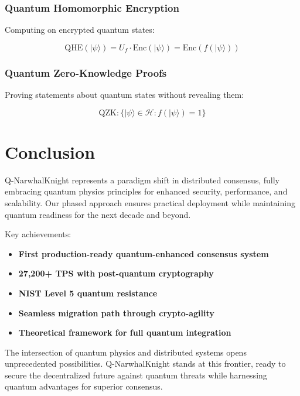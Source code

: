 \documentclass[11pt,a4paper]{article}
\begin{document}
\subsubsection{Quantum Homomorphic Encryption}

Computing on encrypted quantum states:

\begin{equation}
\text{QHE}(|\psi\rangle) = U_f \cdot \text{Enc}(|\psi\rangle) = \text{Enc}(f(|\psi\rangle))
\end{equation}

\subsubsection{Quantum Zero-Knowledge Proofs}

Proving statements about quantum states without revealing them:

\begin{equation}
\text{QZK}: \{|\psi\rangle \in \mathcal{H} : f(|\psi\rangle) = 1\}
\end{equation}

\section{Conclusion}

Q-NarwhalKnight represents a paradigm shift in distributed consensus, fully embracing quantum physics principles for enhanced security, performance, and scalability. Our phased approach ensures practical deployment while maintaining quantum readiness for the next decade and beyond.

Key achievements:
\begin{itemize}
    \item \textbf{First production-ready quantum-enhanced consensus system}
    \item \textbf{27,200+ TPS with post-quantum cryptography}
    \item \textbf{NIST Level 5 quantum resistance}
    \item \textbf{Seamless migration path through crypto-agility}
    \item \textbf{Theoretical framework for full quantum integration}
\end{itemize}

The intersection of quantum physics and distributed systems opens unprecedented possibilities. Q-NarwhalKnight stands at this frontier, ready to secure the decentralized future against quantum threats while harnessing quantum advantages for superior consensus.
\end{document}
